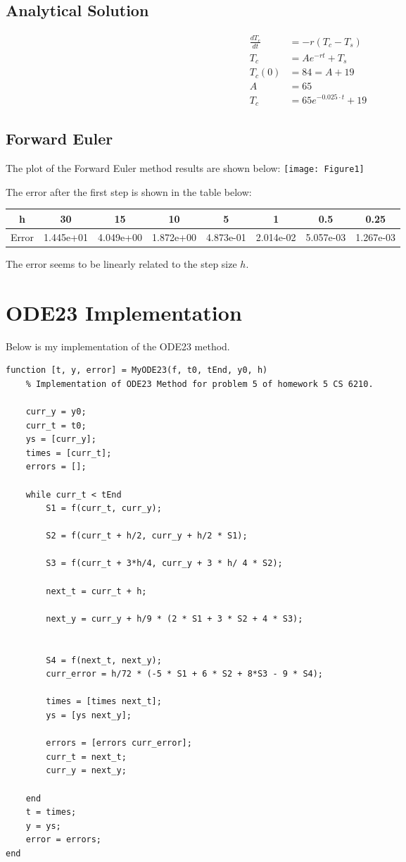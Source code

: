 \documentclass{article}
\begin{document}
\subsection{Analytical Solution}
\begin{align*}
	\frac{dT_c}{dt} &= -r(T_c-T_s)\\
	T_c &= Ae^{-rt} + T_s\\
	T_c(0) &= 84 = A+19\\
	A &= 65\\
	T_c &= 65 e^{-0.025 \cdot t} + 19
\end{align*}

\subsection{Forward Euler}

The plot of the Forward Euler method results are shown below:
\texttt{[image: Figure1]}


The error after the first step is shown in the table below:

\begin{center}
\begin{tabular}{c|c|c|c|c|c|c|c}
 h &  30& 15& 10& 5& 1& 0.5& 0.25\\ \hline
Error &  1.445e+01& 4.049e+00& 1.872e+00& 4.873e-01& 2.014e-02& 5.057e-03& 1.267e-03
\end{tabular}
\end{center}

The error seems to be linearly related to the step size $h$.

\section{ODE23 Implementation}
Below is my implementation of the ODE23 method.
\begin{verbatim}
function [t, y, error] = MyODE23(f, t0, tEnd, y0, h)
    % Implementation of ODE23 Method for problem 5 of homework 5 CS 6210. 
    
    curr_y = y0;
    curr_t = t0;
    ys = [curr_y];
    times = [curr_t];
    errors = [];
    
    while curr_t < tEnd
        S1 = f(curr_t, curr_y);

        S2 = f(curr_t + h/2, curr_y + h/2 * S1);

        S3 = f(curr_t + 3*h/4, curr_y + 3 * h/ 4 * S2);

        next_t = curr_t + h;

        next_y = curr_y + h/9 * (2 * S1 + 3 * S2 + 4 * S3);


        S4 = f(next_t, next_y);
        curr_error = h/72 * (-5 * S1 + 6 * S2 + 8*S3 - 9 * S4);

        times = [times next_t];
        ys = [ys next_y];

        errors = [errors curr_error];
        curr_t = next_t;
        curr_y = next_y;

    end
    t = times;
    y = ys;
    error = errors;
end
\end{verbatim}
\end{document}

